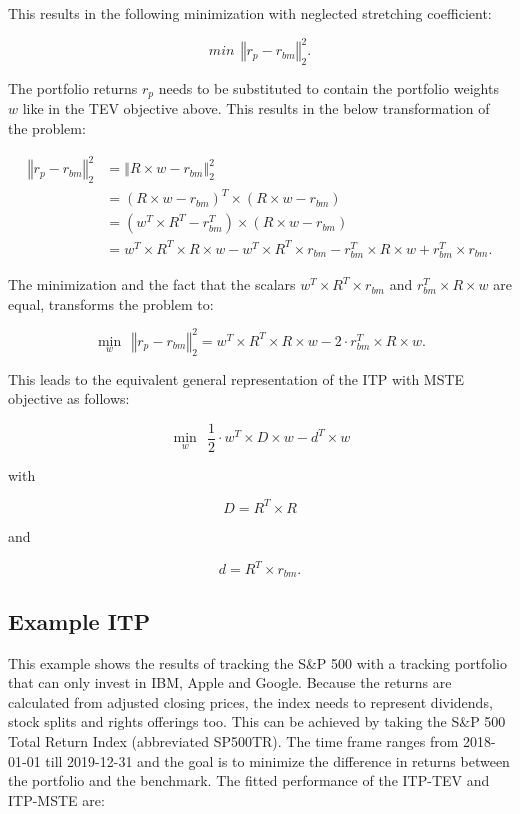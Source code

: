 \documentclass[
  oneside, a4paper, 12pt, openany]{book}
\theoremstyle{definition}
\theoremstyle{definition}
\theoremstyle{definition}
\theoremstyle{definition}
\theoremstyle{remark}
\begin{document}
This results in the following minimization with neglected stretching coefficient:

\[
 min \ \  \left\Vert r_{p}-r_{bm} \right\Vert_2^2.
\]

The portfolio returns \(r_p\) needs to be substituted to contain the portfolio weights \(w\) like in the TEV objective above. This results in the below transformation of the problem:

\begin{align*}
  \left\Vert r_{p}-r_{bm} \right\Vert_2^2 &= \left\Vert R \times w-r_{bm} \right\Vert_2^2 \\ 
  &= (R \times w-r_{bm})^T \times (R \times w-r_{bm}) \\ 
  &= (w^T \times R^T-r_{bm}^T) \times (R \times w-r_{bm}) \\ 
  &= w^T \times R^T \times R \times w - w^T \times R^T \times r_{bm} - r_{bm}^T \times R \times w + r_{bm}^T \times r_{bm}.
\end{align*}

The minimization and the fact that the scalars \(w^T \times R^T \times r_{bm}\) and \(r_{bm}^T \times R \times w\) are equal, transforms the problem to:

\[
  \min\limits_{w} \ \  \left\Vert r_{p}-r_{bm} \right\Vert_2^2 
  = w^T \times R^T \times R \times w - 2\cdot r_{bm}^T \times R \times w.
\]

This leads to the equivalent general representation of the ITP with MSTE objective as follows:

\[
  \min\limits_{w} \ \ \frac{1}{2} \cdot w^T \times D \times w - d^T \times w
\]

with

\[
D = R^T \times R
\]

and

\[
  d = R^T \times r_{bm}.
\]

\hypertarget{example-itp}{%
\subsection{Example ITP}\label{example-itp}}

This example shows the results of tracking the S\&P 500 with a tracking portfolio that can only invest in IBM, Apple and Google. Because the returns are calculated from adjusted closing prices, the index needs to represent dividends, stock splits and rights offerings too. This can be achieved by taking the S\&P 500 Total Return Index (abbreviated SP500TR). The time frame ranges from 2018-01-01 till 2019-12-31 and the goal is to minimize the difference in returns between the portfolio and the benchmark. The fitted performance of the ITP-TEV and ITP-MSTE are:
\end{document}
